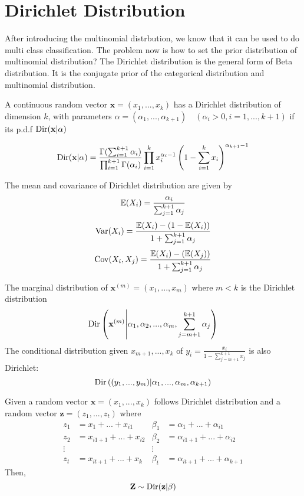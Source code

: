 \section{Dirichlet Distribution}
	After introducing the multinomial distrbution, we know that it can be used to do multi class classification. The problem now is how to set the prior distribution of multinomial distribution? The Dirichlet distribution is the general form of Beta distribution. It is the conjugate prior of the categorical distribution and multinomial distribution.  
	
	\begin{definition}
		A continuous random vector $\textbf{x} = (x_1,...,x_k)$ has a Dirichlet distribution of dimension $k$, with parameters $\alpha = (\alpha_1,...,\alpha_{k+1}) \quad (\alpha_i>0, i = 1,...,k+1)$ if its p.d.f $\mathrm{Dir}(\textbf{x}|\alpha)$
		
		\begin{equation}
			\mathrm{Dir}(\textbf{x}|\alpha) = \frac{\Gamma(\sum_{i =1}^{k+1}\alpha_i)}{\prod_{i=1}^{k+1}\Gamma(\alpha_i)}\prod_{i=1}^{k}x_i^{\alpha_i - 1}\left(1-\sum_{i = 1}^{k}x_i\right)^{\alpha_{k+1}-1}
		\end{equation}
	\end{definition}
	The mean and covariance of Dirichlet distribution are given by
	$$\mathbb{E}(X_i) = \frac{\alpha_i}{\sum_{j = 1}^{k+1}\alpha_j}$$
	$$\mathrm{Var}(X_i) = \frac{\mathbb{E}(X_i) - (1-\mathbb{E}(X_i))}{1+\sum_{j = 1}^{k+1}\alpha_j}$$
	$$\mathrm{Cov}(X_i, X_j) = \frac{\mathbb{E}(X_i) - (\mathbb{E}(X_j))}{1+\sum_{j = 1}^{k+1}\alpha_j}$$
	
	
	\begin{theorem}
		The marginal distribution of $\textbf{x}^{(m)} = (x_1,...,x_m)$ where $m<k$ is the Dirichlet distribution 
		\begin{equation}
			\mathrm{Dir}\left(\textbf{x}^{(m)}\middle|\alpha_1, \alpha_2,...,\alpha_m, \sum_{j = m+1}^{k+1}\alpha_j\right)
		\end{equation}
		The conditional distribution given $x_{m+1},...,x_k$ of $y_i = \frac{x_i}{1-\sum_{j = m+1}^{k+1}x_j}$ is also Dirichlet:
		\begin{equation}
			\mathrm{Dir}\left((y_1,...,y_m)\middle|\alpha_1,...,\alpha_m,\alpha_{k+1}\right)
		\end{equation}
	\end{theorem}



	\begin{theorem}[Transformation]
		Given a random vector $\textbf{x} = (x_1,...,x_k)$ follows Dirichlet distribution and a random vector $\textbf{z} = (z_1,...,z_t)$ where
		\begin{align*}
			z_1 &= x_1 + ... + x_{i1} & \beta_1 &= \alpha_1 + ... + \alpha_{i1}\\
			z_2 &= x_{i1+1} + ... + x_{i2} & \beta_2 &= \alpha_{i1+1} + ... + \alpha_{i2}\\
			\vdots& & \vdots&\\
			z_t &= x_{it+1} + ... + x_k & \beta_t &= \alpha_{it+1} + ... + \alpha_{k+1}
		\end{align*}
	Then,
	$$\textbf{Z}\sim \mathrm{Dir}(\textbf{z}|\beta)$$
	\end{theorem}

